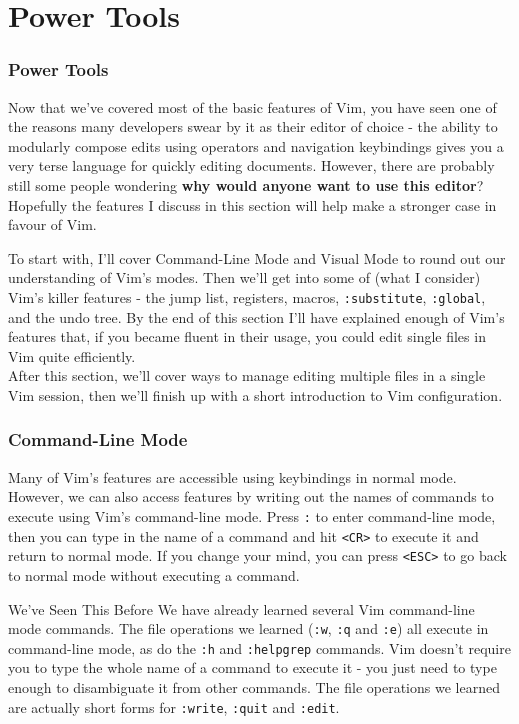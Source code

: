 \documentclass{beamer}
\begin{document}
\section{Power Tools}

\begin{frame}[fragile]
    \frametitle{Power Tools}
    \tableofcontents[currentsection]
\end{frame}

\begin{frame}[fragile]
    Now that we've covered most of the basic features of Vim, you have seen one of the reasons many developers swear by it as their editor of choice - the ability to modularly compose edits using operators and navigation keybindings gives you a very terse language for quickly editing documents. However, there are probably still some people wondering \textbf{why would anyone want to use this editor}? Hopefully the features I discuss in this section will help make a stronger case in favour of Vim.
\end{frame}

\begin{frame}[fragile]
    To start with, I'll cover Command-Line Mode and Visual Mode to round out our understanding of Vim's modes. Then we'll get into some of (what I consider) Vim's killer features - the jump list, registers, macros, \verb+:substitute+, \verb+:global+, and the undo tree. By the end of this section I'll have explained enough of Vim's features that, if you became fluent in their usage, you could edit single files in Vim quite efficiently. \\
    \vspace{0.5cm}
    After this section, we'll cover ways to manage editing multiple files in a single Vim session, then we'll finish up with a short introduction to Vim configuration.
\end{frame}

\begin{frame}[fragile]
    \frametitle{Command-Line Mode}
    Many of Vim's features are accessible using keybindings in normal mode. However, we can also access features by writing out the names of commands to execute using Vim's command-line mode. Press \verb+:+ to enter command-line mode, then you can type in the name of a command and hit \verb+<CR>+ to execute it and return to normal mode. If you change your mind, you can press \verb+<ESC>+ to go back to normal mode without executing a command.\\
    \vspace{0.5cm}
    \begin{block}{We've Seen This Before}
	We have already learned several Vim command-line mode commands. The file operations we learned (\verb+:w+, \verb+:q+ and \verb+:e+) all execute in command-line mode, as do the \verb+:h+ and \verb+:helpgrep+ commands. Vim doesn't require you to type the whole name of a command to execute it - you just need to type enough to disambiguate it from other commands. The file operations we learned are actually short forms for \verb+:write+, \verb+:quit+ and \verb+:edit+.
    \end{block}
\end{frame}
\end{document}
